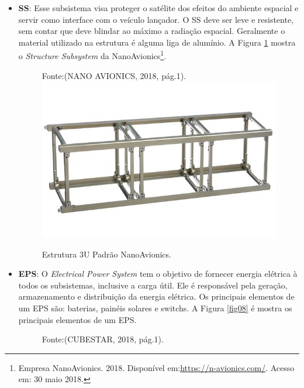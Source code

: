 \begin{itemize}
	
	\item \textbf{SS}: Esse subsistema visa proteger o satélite dos efeitos do ambiente espacial e servir como interface com o veículo lançador. O SS deve ser leve e resistente, sem contar que deve blindar ao máximo a radiação espacial. Geralmente o material utilizado na estrutura é alguma liga de alumínio.  A Figura \ref{fig07} mostra o \textit{Structure Subsystem} da NanoAvionics\footnote{Empresa NanoAvionics. 2018. Disponível em:\url{https://n-avionics.com/}. Acesso em: 30 maio 2018.}.
	
	\begin{figure}[h]
\footnotesize{
		\centering
		Fonte:(NANO AVIONICS, 2018, pág.1).	\linebreak
		\includegraphics[keepaspectratio=true,scale=0.45]{figuras/cubesat-structure-main.jpg}
		\caption{Estrutura 3U Padrão NanoAvionics.}
		\label{fig07}
	}
	\end{figure}
	\FloatBarrier
	
	\item \textbf{EPS}: O \textit{Electrical Power System} tem o objetivo de fornecer energia elétrica à todos os subsistemas, inclusive a carga útil. Ele é responsável pela geração, armazenamento e distribuição da energia elétrica. Os principais elementos de um EPS são: baterias, painéis solares e switchs. A Figura \ref{fig08} é mostra os principais elementos de um EPS.
	
	\begin{figure}[h]
	\footnotesize{
		\centering
		Fonte:(CUBESTAR, 2018, pág.1).\linebreak
		
}
\end{figure}
\end{itemize}
